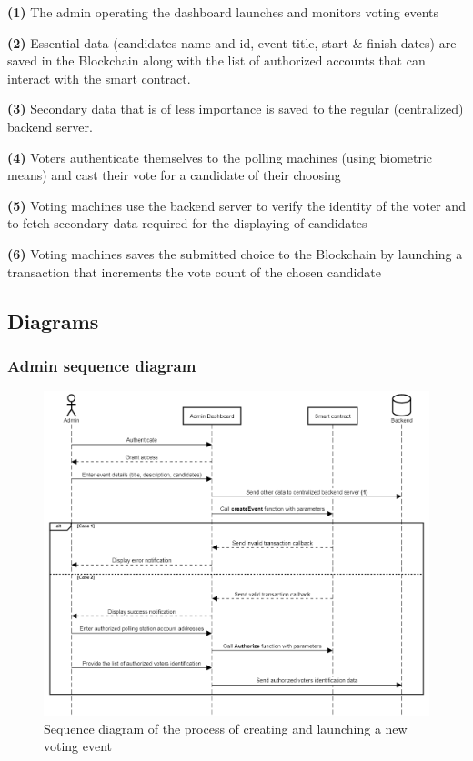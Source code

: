 \begin{list}{}{}
\item \textbf{(1)} The admin operating the dashboard launches and monitors voting events
\item \textbf{(2)} Essential data (candidates name and id, event title, start \& finish dates) are saved in the Blockchain along with the list of authorized accounts that can interact with the smart contract.
\item \textbf{(3)} Secondary data that is of less importance is saved to the regular (centralized) backend server.
\item \textbf{(4)} Voters authenticate themselves to the polling machines (using biometric means) and cast their vote for a candidate of their choosing
\item \textbf{(5)} Voting machines use the backend server to verify the identity of the voter and to fetch secondary data required for the displaying of candidates
\item \textbf{(6)} Voting machines saves the submitted choice to the Blockchain by launching a transaction that increments the vote count of the chosen candidate
\end{list}

\subsection{Diagrams}
\subsubsection{Admin sequence diagram}

\begin{figure}[H]
	\centering
		\includegraphics[width=14cm]{images/chapter3/admin_sequence_diagram.png}
		\caption{{\footnotesize Sequence diagram of the process of creating and launching a new voting event}}
\end{figure}

